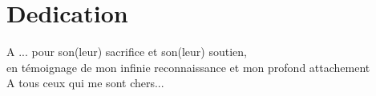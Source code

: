 \documentclass[a4paper, oneside, english, 12pt, final]{extreport}
\newcommand{\reportAuthor} {%
  FirstName \textsc{LastName}%
}
\begin{document}
%


	




\chapter*{Dedication}
\thispagestyle{empty}
%

\begin{center}
 {\it 
	
A ... pour son(leur) sacrifice et son(leur) soutien, \\
en témoignage de mon infinie reconnaissance et mon profond attachement \\
\vspace{1cm}
A tous ceux qui me sont chers...

}
\end{center}
%
%
\end{document}
